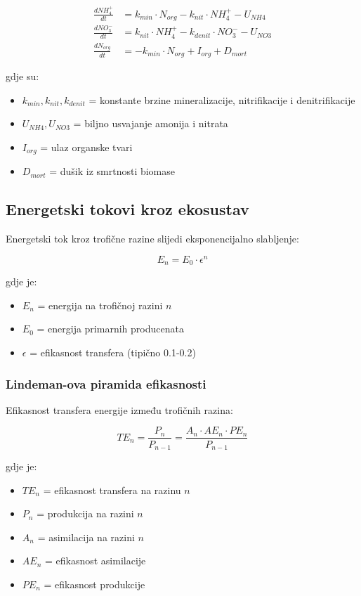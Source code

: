\documentclass[11pt,oneside]{book}
\begin{document}
\begin{align}
	\frac{dNH_4^+}{dt} &= k_{min} \cdot N_{org} - k_{nit} \cdot NH_4^+ - U_{NH4}\\
	\frac{dNO_3^-}{dt} &= k_{nit} \cdot NH_4^+ - k_{denit} \cdot NO_3^- - U_{NO3}\\
	\frac{dN_{org}}{dt} &= -k_{min} \cdot N_{org} + I_{org} + D_{mort}
\end{align}

gdje su:
\begin{itemize}
	\item $k_{min}, k_{nit}, k_{denit}$ = konstante brzine mineralizacije, nitrifikacije i denitrifikacije
	\item $U_{NH4}, U_{NO3}$ = biljno usvajanje amonija i nitrata
	\item $I_{org}$ = ulaz organske tvari
	\item $D_{mort}$ = dušik iz smrtnosti biomase
\end{itemize}

\subsection{Energetski tokovi kroz ekosustav}

Energetski tok kroz trofične razine slijedi eksponencijalno slabljenje:

\begin{equation}
	E_n = E_0 \cdot \epsilon^n
\end{equation}

gdje je:
\begin{itemize}
	\item $E_n$ = energija na trofičnoj razini $n$
	\item $E_0$ = energija primarnih producenata
	\item $\epsilon$ = efikasnost transfera (tipično 0.1-0.2)
\end{itemize}

\subsubsection{Lindeman-ova piramida efikasnosti}

Efikasnost transfera energije između trofičnih razina:

\begin{equation}
	TE_n = \frac{P_n}{P_{n-1}} = \frac{A_n \cdot AE_n \cdot PE_n}{P_{n-1}}
\end{equation}

gdje je:
\begin{itemize}
	\item $TE_n$ = efikasnost transfera na razinu $n$
	\item $P_n$ = produkcija na razini $n$
	\item $A_n$ = asimilacija na razini $n$
	\item $AE_n$ = efikasnost asimilacije
	\item $PE_n$ = efikasnost produkcije
\end{itemize}
\end{document}
